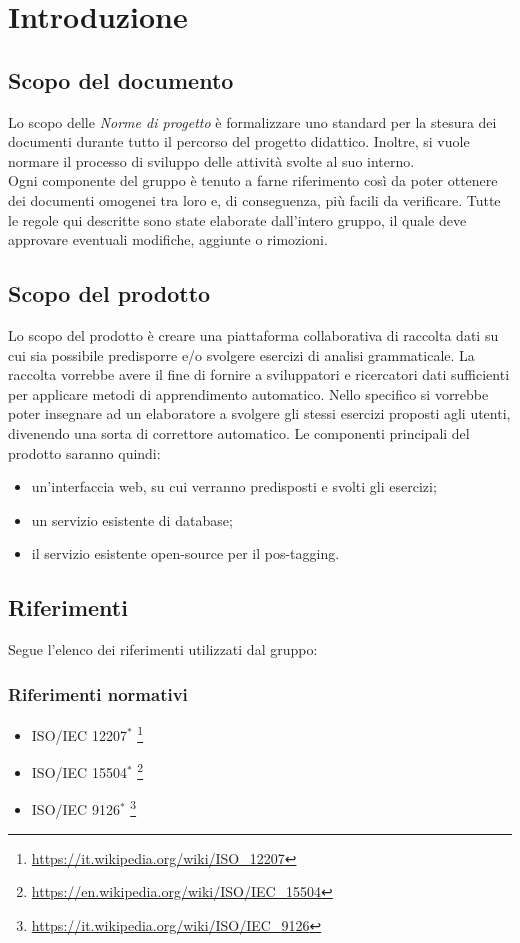 \documentclass[11pt,a4paper]{article}
\begin{document}
	\newpage	

	\renewcommand  \contentsname {\Large Indice} 
	
	\tableofcontents
	\newpage
	
	\section{Introduzione}
	\subsection{Scopo del documento}
	Lo scopo delle \textit{Norme di progetto} è formalizzare uno standard per la stesura dei documenti durante tutto il percorso del progetto didattico. Inoltre, si vuole normare il processo di sviluppo delle attività svolte al suo interno. 
	\\Ogni componente del gruppo è tenuto a farne riferimento così da poter ottenere dei documenti omogenei tra loro e, di conseguenza, più facili da verificare. 
	Tutte le regole qui descritte sono state elaborate dall'intero gruppo, il quale deve approvare eventuali modifiche, aggiunte o rimozioni.
	\subsection{Scopo del prodotto}
	Lo scopo del prodotto è creare una piattaforma collaborativa di raccolta dati su cui sia possibile predisporre e/o svolgere esercizi di analisi grammaticale. La raccolta vorrebbe avere il fine di fornire a sviluppatori e ricercatori dati sufficienti per applicare metodi di apprendimento automatico. Nello specifico si vorrebbe poter insegnare ad un elaboratore a svolgere gli stessi esercizi proposti agli utenti, divenendo una sorta di correttore automatico.  
	Le componenti principali del prodotto saranno quindi:
	\begin{itemize}
		\item un'interfaccia web, su cui verranno predisposti e svolti gli esercizi;
		\item un servizio esistente di database;
		\item il servizio esistente open-source per il pos-tagging.
	\end{itemize}
	
	\subsection{Riferimenti}
	Segue l'elenco dei riferimenti utilizzati dal gruppo:
	\subsubsection{Riferimenti normativi}
	\begin{itemize}
		\item ISO/IEC 12207$^*$
		\footnote{\url {https://it.wikipedia.org/wiki/ISO\_12207}}
		
		\item ISO/IEC 15504$^*$
		\footnote{\url {https://en.wikipedia.org/wiki/ISO/IEC\_15504}}
		\item ISO/IEC 9126$^*$
		\footnote{\url {https://it.wikipedia.org/wiki/ISO/IEC\_9126}}
	\end{itemize}	
	
\end{document}
